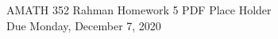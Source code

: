 \documentclass[reqno]{amsart}
\theoremstyle{definition}
\begin{document}
\begin{flushleft}
{\sc \Large AMATH 352 Rahman} \hfill Homework 5 PDF Place Holder\\
Due Monday, December 7, 2020
\bigskip
\end{flushleft}

\newcommand{\R}{\mathbb{R}}
\newcommand{\N}{\mathbb{N}}
\newcommand{\Z}{\mathbb{Z}}
\newcommand{\Q}{\mathbb{Q}}
\renewcommand{\CancelColor}{\color{red}}
\newcommand{\?}{\stackrel{?}{=}}
\renewcommand{\varphi}{\phi}
\newcommand{\card}{\text{Card}}
\newcommand{\bigzero}{\text{\Huge 0}}
\newcommand{\curvearrowdown}{{\color{red}\rotatebox{90}{$\curvearrowleft$}}}
\newcommand{\curvearrowup}{{\color{red}\rotatebox{90}{$\curvearrowright$}}}

\newcommand*\circled[1]{\color{red}\tikz[baseline=(char.base)]{
            \node[shape=circle,draw,inner sep=2pt] (char) {#1};}}
\end{document}
